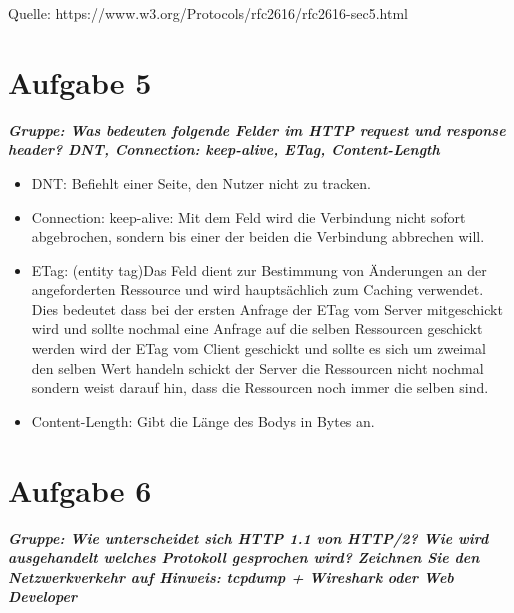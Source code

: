 \documentclass[12pt, a4paper]{report}
\begin{document}
Quelle: https://www.w3.org/Protocols/rfc2616/rfc2616-sec5.html
\section*{Aufgabe 5}
\textbf{\textit{Gruppe: Was bedeuten folgende Felder im HTTP request und response header? DNT,
Connection: keep-alive, ETag, Content-Length}}
\begin{itemize}
	\item DNT: Befiehlt einer Seite, den Nutzer nicht zu tracken.
	\item Connection: keep-alive: Mit dem Feld wird die Verbindung nicht sofort abgebrochen, sondern bis einer der beiden die Verbindung abbrechen will.
	\item ETag: (entity tag)Das Feld dient zur Bestimmung von Änderungen an der angeforderten Ressource und wird hauptsächlich zum Caching verwendet. Dies bedeutet dass bei der ersten Anfrage der ETag vom Server mitgeschickt wird und sollte nochmal eine Anfrage auf die selben Ressourcen geschickt werden wird der ETag vom Client geschickt und sollte es sich um zweimal den selben Wert handeln schickt der Server die Ressourcen nicht nochmal sondern weist darauf hin, dass die Ressourcen noch immer die selben sind.
	\item Content-Length: Gibt die Länge des Bodys in Bytes an.
\end{itemize}

\section*{Aufgabe 6}
\textbf{\textit{Gruppe: Wie unterscheidet sich HTTP 1.1 von HTTP/2? Wie wird ausgehandelt welches
Protokoll gesprochen wird? Zeichnen Sie den Netzwerkverkehr auf Hinweis: tcpdump +
Wireshark oder Web Developer}}
\end{document}
